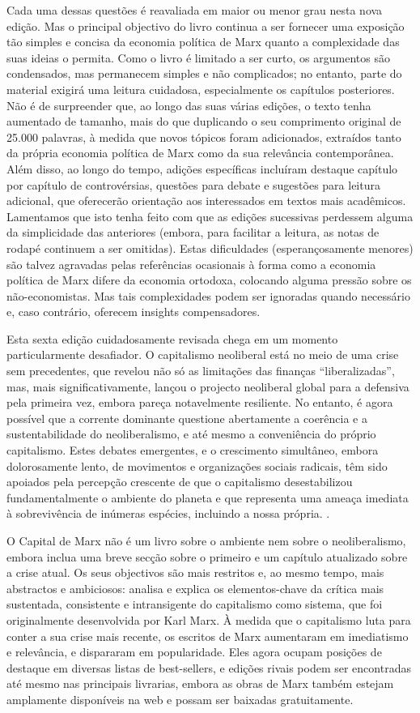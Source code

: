 Cada uma dessas questões é reavaliada em maior ou menor grau nesta nova edição. Mas o principal objectivo do livro continua a ser fornecer uma exposição tão simples e concisa da economia política de Marx quanto a complexidade das suas ideias o permita. Como o livro é limitado a ser curto, os argumentos são condensados, mas permanecem simples e não complicados; no entanto, parte do material exigirá uma leitura cuidadosa, especialmente os capítulos posteriores. Não é de surpreender que, ao longo das suas várias edições, o texto tenha aumentado de tamanho, mais do que duplicando o seu comprimento original de {\color{blue}25}.{\color{blue}000} palavras, à medida que novos tópicos foram adicionados, extraídos tanto da própria economia política de Marx como da sua relevância contemporânea. Além disso, ao longo do tempo, adições específicas incluíram destaque capítulo por capítulo de controvérsias, questões para debate e sugestões para leitura adicional, que oferecerão orientação aos interessados ​​em textos mais acadêmicos. Lamentamos que isto tenha feito com que as edições sucessivas perdessem alguma da simplicidade das anteriores (embora, para facilitar a leitura, as notas de rodapé continuem a ser omitidas). Estas dificuldades (esperançosamente menores) são talvez agravadas pelas referências ocasionais à forma como a economia política de Marx difere da economia ortodoxa, colocando alguma pressão sobre os não-economistas. Mas tais complexidades podem ser ignoradas quando necessário e, caso contrário, oferecem insights compensadores.
 \par 
Esta sexta edição cuidadosamente revisada chega em um momento particularmente desafiador. O capitalismo neoliberal está no meio de uma crise sem precedentes, que revelou não só as limitações das finanças “liberalizadas”, mas, mais significativamente, lançou o projecto neoliberal global para a defensiva pela primeira vez, embora pareça notavelmente resiliente. No entanto, é agora possível que a corrente dominante questione abertamente a coerência e a sustentabilidade do neoliberalismo, e até mesmo a conveniência do próprio capitalismo. Estes debates emergentes, e o crescimento simultâneo, embora dolorosamente lento, de movimentos e organizações sociais radicais, têm sido apoiados pela percepção crescente de que o capitalismo desestabilizou fundamentalmente o ambiente do planeta e que representa uma ameaça imediata à sobrevivência de inúmeras espécies, incluindo a nossa própria. .
 \par 
O Capital de Marx não é um livro sobre o ambiente nem sobre o neoliberalismo, embora inclua uma breve secção sobre o primeiro e um capítulo atualizado sobre a crise atual. Os seus objectivos são mais restritos e, ao mesmo tempo, mais abstractos e ambiciosos: analisa e explica os elementos-chave da crítica mais sustentada, consistente e intransigente do capitalismo como sistema, que foi originalmente desenvolvida por Karl Marx. À medida que o capitalismo luta para conter a sua crise mais recente, os escritos de Marx aumentaram em imediatismo e relevância, e dispararam em popularidade. Eles agora ocupam posições de destaque em diversas listas de best-sellers, e edições rivais podem ser encontradas até mesmo nas principais livrarias, embora as obras de Marx também estejam amplamente disponíveis na web e possam ser baixadas gratuitamente.
